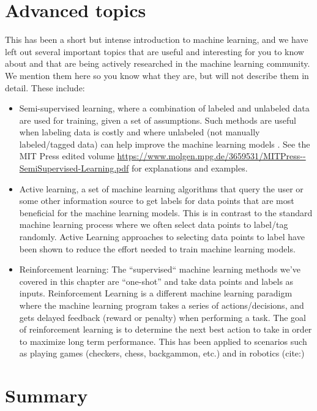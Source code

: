 \documentclass[]{krantz}
\begin{document}
\section{Advanced topics}\label{advanced-topics}

This has been a short but intense introduction to machine learning, and
we have left out several important topics that are useful and
interesting for you to know about and that are being actively researched
in the machine learning community. We mention them here so you know what
they are, but will not describe them in detail. These include:

\begin{itemize}
\item
  Semi-supervised learning, where a combination of labeled and unlabeled
  data are used for training, given a set of assumptions. Such methods
  are useful when labeling data is costly and where unlabeled (not
  manually labeled/tagged data) can help improve the machine learning
  models . See the MIT Press edited volume
  \url{https://www.molgen.mpg.de/3659531/MITPress--SemiSupervised-Learning.pdf}
  for explanations and examples.
\item
  Active learning, a set of machine learning algorithms that query the
  user or some other information source to get labels for data points
  that are most beneficial for the machine learning models. This is in
  contrast to the standard machine learning process where we often
  select data points to label/tag randomly. Active Learning approaches
  to selecting data points to label have been shown to reduce the effort
  needed to train machine learning models.
\item
  Reinforcement learning: The ``supervised`` machine learning methods
  we've covered in this chapter are ``one-shot'' and take data points
  and labels as inputs. Reinforcement Learning is a different machine
  learning paradigm where the machine learning program takes a series of
  actions/decisions, and gets delayed feedback (reward or penalty) when
  performing a task. The goal of reinforcement learning is to determine
  the next best action to take in order to maximize long term
  performance. This has been applied to scenarios such as playing games
  (checkers, chess, backgammon, etc.) and in robotics (cite:)
\end{itemize}

\section{Summary}\label{summary-3}
\end{document}
